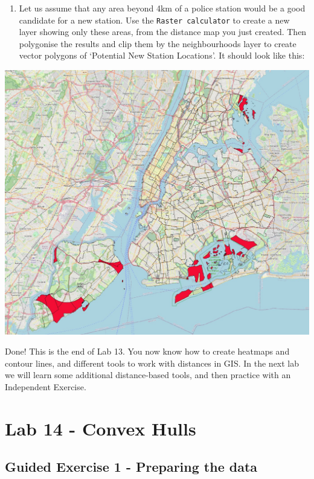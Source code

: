 \documentclass[
  letterpaper,
  DIV=11,
  numbers=noendperiod]{scrreprt}
\providecommand{\tightlist}{%
  \setlength{\itemsep}{0pt}\setlength{\parskip}{0pt}}\usepackage{longtable,booktabs,array}
\begin{document}
\begin{enumerate}
\def\labelenumi{(\arabic{enumi})}
\setcounter{enumi}{351}
\tightlist
\item
  Let us assume that any area beyond 4km of a police station would be a
  good candidate for a new station. Use the \texttt{Raster\ calculator}
  to create a new layer showing only these areas, from the distance map
  you just created. Then polygonise the results and clip them by the
  neighbourhoods layer to create vector polygons of `Potential New
  Station Locations'. It should look like this:
\end{enumerate}

\includegraphics{images/lab_13/lab_13_potential_areas.jpg}

Done! This is the end of Lab 13. You now know how to create heatmaps and
contour lines, and different tools to work with distances in GIS. In the
next lab we will learn some additional distance-based tools, and then
practice with an Independent Exercise.

\chapter{Lab 14 - Convex Hulls}\label{sec-spatan5}

\section{Guided Exercise 1 - Preparing the
data}\label{guided-exercise-1---preparing-the-data}
\end{document}
